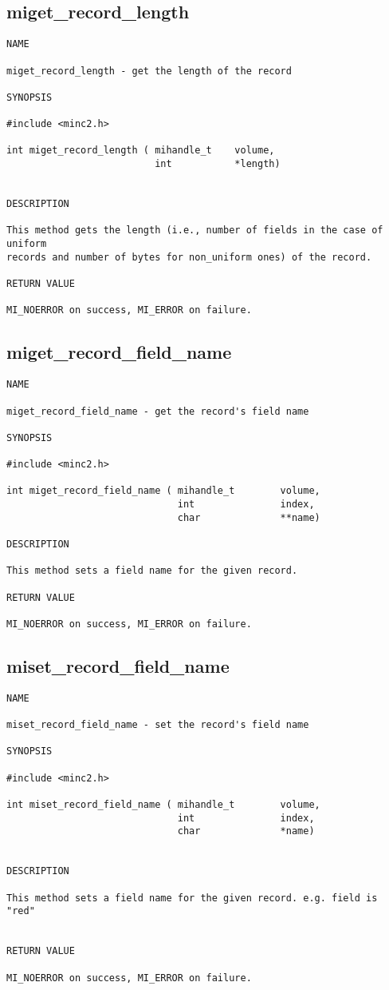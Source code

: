 \documentclass{article}
\begin{document}
\subsection{miget\_record\_length}
\begin{verbatim}
NAME

miget_record_length - get the length of the record

SYNOPSIS

#include <minc2.h>

int miget_record_length ( mihandle_t    volume,
                          int           *length)


DESCRIPTION

This method gets the length (i.e., number of fields in the case of uniform
records and number of bytes for non_uniform ones) of the record.

RETURN VALUE

MI_NOERROR on success, MI_ERROR on failure.
\end{verbatim}

\subsection{miget\_record\_field\_name}
\begin{verbatim}
NAME

miget_record_field_name - get the record's field name

SYNOPSIS

#include <minc2.h>

int miget_record_field_name ( mihandle_t        volume,
                              int               index,
                              char              **name)

DESCRIPTION

This method sets a field name for the given record.

RETURN VALUE

MI_NOERROR on success, MI_ERROR on failure.
\end{verbatim}

\subsection{miset\_record\_field\_name}
\begin{verbatim}
NAME

miset_record_field_name - set the record's field name

SYNOPSIS

#include <minc2.h>

int miset_record_field_name ( mihandle_t        volume,
                              int               index,
                              char              *name)
                                

DESCRIPTION

This method sets a field name for the given record. e.g. field is "red"


RETURN VALUE

MI_NOERROR on success, MI_ERROR on failure.
\end{verbatim}
\end{document}
